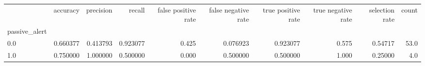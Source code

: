 \begin{tabular}{lrrrrrrrrr}
\toprule
{} &  accuracy &  precision &    recall &  false positive rate &  false negative rate &  true positive rate &  true negative rate &  selection rate &  count \\
passive\_alert &           &            &           &                      &                      &                     &                     &                 &        \\
\midrule
0.0           &  0.660377 &   0.413793 &  0.923077 &                0.425 &             0.076923 &            0.923077 &               0.575 &         0.54717 &   53.0 \\
1.0           &  0.750000 &   1.000000 &  0.500000 &                0.000 &             0.500000 &            0.500000 &               1.000 &         0.25000 &    4.0 \\
\bottomrule
\end{tabular}

